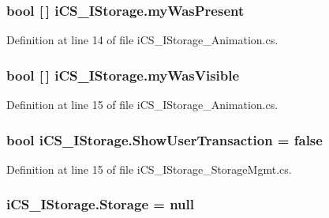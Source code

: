 \hypertarget{classi_c_s___i_storage_ac59109ff4abd2826cc3dff8f7f2dc3e7}{
\subsubsection[{my\+Was\+Present}]{\setlength{\rightskip}{0pt plus 5cm}bool \mbox{[}$\,$\mbox{]} i\+C\+S\+\_\+\+I\+Storage.\+my\+Was\+Present}}\label{classi_c_s___i_storage_ac59109ff4abd2826cc3dff8f7f2dc3e7}


Definition at line 14 of file i\+C\+S\+\_\+\+I\+Storage\+\_\+\+Animation.\+cs.

\hypertarget{classi_c_s___i_storage_a7d5f27f4e96fa702fe7f78865be2854e}{
\subsubsection[{my\+Was\+Visible}]{\setlength{\rightskip}{0pt plus 5cm}bool \mbox{[}$\,$\mbox{]} i\+C\+S\+\_\+\+I\+Storage.\+my\+Was\+Visible}}\label{classi_c_s___i_storage_a7d5f27f4e96fa702fe7f78865be2854e}


Definition at line 15 of file i\+C\+S\+\_\+\+I\+Storage\+\_\+\+Animation.\+cs.

\hypertarget{classi_c_s___i_storage_aa67184e812e84967bfc2793d09b34eb5}{
\subsubsection[{Show\+User\+Transaction}]{\setlength{\rightskip}{0pt plus 5cm}bool i\+C\+S\+\_\+\+I\+Storage.\+Show\+User\+Transaction = false}}\label{classi_c_s___i_storage_aa67184e812e84967bfc2793d09b34eb5}


Definition at line 15 of file i\+C\+S\+\_\+\+I\+Storage\+\_\+\+Storage\+Mgmt.\+cs.

\hypertarget{classi_c_s___i_storage_a5ac94101a8d712672043f618c201f38b}{
\subsubsection[{Storage}]{ i\+C\+S\+\_\+\+I\+Storage.\+Storage = null}}\label{classi_c_s___i_storage_a5ac94101a8d712672043f618c201f38b}


